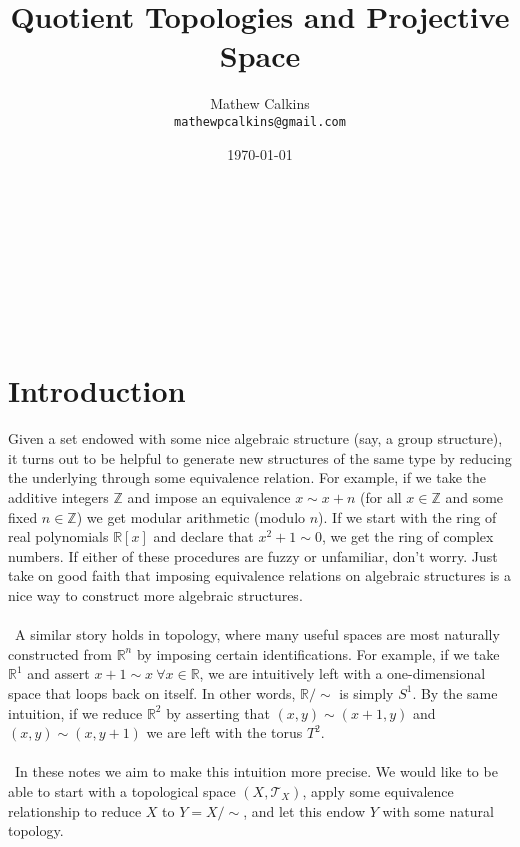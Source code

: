 \documentclass[12 pt]{article}
\newcommand{\R}{\mathbb{R}}
\newcommand{\Z}{\mathbb{Z}}
\newcommand{\T}{\mathcal{T}}
\numberwithin{equation}{section}
\begin{document}
\title{Quotient Topologies and Projective Space}
\author{Mathew Calkins\\
  \texttt{mathewpcalkins@gmail.com}}

\date{\today}


\maketitle
\
\\
\

\\
\\
\
\section{Introduction}
Given a set endowed with some nice algebraic structure (say, a group structure), it turns out to be helpful to generate new structures of the same type by reducing the underlying through some equivalence relation. For example, if we take the additive integers $\Z$ and impose an equivalence $x \sim x + n$ (for all $x \in \Z$ and some fixed $n \in \Z$) we get modular arithmetic (modulo $n$). If we start with the ring of real polynomials $\R[x]$ and declare that $x^2 + 1 \sim 0$, we get the ring of complex numbers. If either of these procedures are fuzzy or unfamiliar, don't worry. Just take on good faith that imposing equivalence relations on algebraic structures is a nice way to construct more algebraic structures.\\
\\
\
A similar story holds in topology, where many useful spaces are most naturally constructed from $\R^n$ by imposing certain identifications. For example, if we take $\R^1$ and assert $x + 1 \sim x \ \forall x \in \R$, we are intuitively left with a one-dimensional space that loops back on itself. In other words, $\R / \sim$ is simply $S^1$. By the same intuition, if we reduce $\R^2$ by asserting that $(x,y) \sim (x+1,y)$ and $(x,y) \sim (x, y+1)$ we are left with the torus $T^2$.\\
\\
\
In these notes we aim to make this intuition more precise. We would like to be able to start with a topological space $(X, \T_X)$, apply some equivalence relationship to reduce $X$ to $Y = X / \sim$, and let this endow $Y$ with some natural topology.
\end{document}

